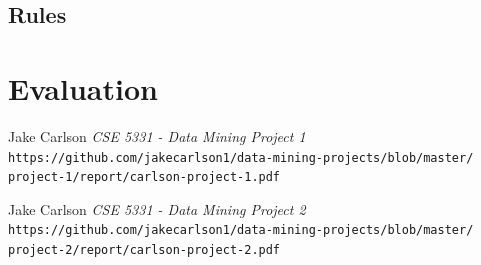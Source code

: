 \documentclass{article}
\begin{document}
    \subsection{Rules}
    

\section{Evaluation}

\begin{thebibliography}{10}
    Jake Carlson
    \textit{CSE 5331 - Data Mining Project 1}
    \texttt{https://github.com/jakecarlson1/data-mining-projects/blob/master/}
    \texttt{project-1/report/carlson-project-1.pdf}

    Jake Carlson
    \textit{CSE 5331 - Data Mining Project 2}
    \texttt{https://github.com/jakecarlson1/data-mining-projects/blob/master/}
    \texttt{project-2/report/carlson-project-2.pdf}

\end{thebibliography}
\end{document}
